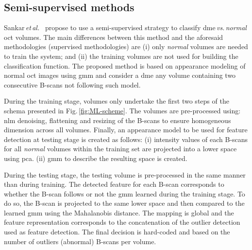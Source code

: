 \subsection{Semi-supervised methods}
Sankar\,\textit{et\,al.}~\cite{sankar2016classification} propose to use a semi-supervised strategy to classify \gls{dme}\,\emph{vs.\,normal} \gls{oct} volumes.
The main differences between this method and the aforesaid methodologies (supervised methodologies) are
(i) only \emph{normal} volumes are needed to train the system;
and (ii) the training volumes are not used for building the classification function.
The proposed method is based on appearance modeling of normal \gls{oct} images using \gls{gmm} and consider a \gls{dme} any volume containing two consecutive B-scans not following such model.

During the training stage, volumes only undertake the first two steps of the schema presented in Fig.\,\ref{fig:ML-scheme}.
The volumes are pre-processed using: \gls{nlm} denoising, flattening and resizing of the B-scans to ensure homogeneous dimension across all volumes.
Finally, an appearance model to be used for feature detection at testing stage is created as follows:
(i) intensity values of each B-scans for all \emph{normal} volumes within the training set are projected into a lower space using \gls{pca}.
(ii) \gls{gmm} to describe the resulting space is created.

During the testing stage, the testing volume is pre-processed in the same manner than during training.
The detected feature for each B-scan corresponds to whether the B-scan follows or not the \gls{gmm} learned during the training stage.
To do so, the B-scan is projected to the same lower space and then compared to the learned \gls{gmm} using the Mahalanobis distance.
The mapping is global and the feature representation corresponds to the concatenation of the outlier detection used as feature detection.
The final decision is hard-coded and based on the number of outliers (abnormal) B-scans per volume.

